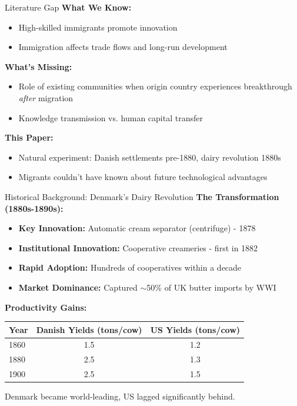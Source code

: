 \documentclass{beamer}
\begin{document}
\begin{frame}{Literature Gap}
\textbf{What We Know:}
\begin{itemize}
    \item High-skilled immigrants promote innovation \parencite{hornung2014immigration, moser2014german}
    \item Immigration affects trade flows and long-run development \parencite{sequeira2020immigrants}
\end{itemize}

\vspace{0.3cm}
\textbf{What's Missing:}
\begin{itemize}
    \item Role of existing communities when origin country experiences breakthrough \textit{after} migration
    \item Knowledge transmission vs. human capital transfer
\end{itemize}

\vspace{0.3cm}
\textbf{This Paper:}
\begin{itemize}
    \item Natural experiment: Danish settlements pre-1880, dairy revolution 1880s
    \item Migrants couldn't have known about future technological advantages
\end{itemize}
\end{frame}

\begin{frame}{Historical Background: Denmark's Dairy Revolution}
\textbf{The Transformation (1880s-1890s):}
\begin{itemize}
    \item \textbf{Key Innovation:} Automatic cream separator (centrifuge) - 1878
    \item \textbf{Institutional Innovation:} Cooperative creameries - first in 1882
    \item \textbf{Rapid Adoption:} Hundreds of cooperatives within a decade
    \item \textbf{Market Dominance:} Captured $\sim$50\% of UK butter imports by WWI
\end{itemize}

\vspace{0.3cm}
\textbf{Productivity Gains:}
\begin{table}[h]
\centering
\small
\begin{tabular}{lcc}
\hline
Year & Danish Yields (tons/cow) & US Yields (tons/cow) \\
\hline
1860 & 1.5 & 1.2 \\
1880 & 2.5 & 1.3 \\
1900 & 2.5 & 1.5 \\
\hline
\end{tabular}
\end{table}

Denmark became world-leading, US lagged significantly behind.
\end{frame}
\end{document}

